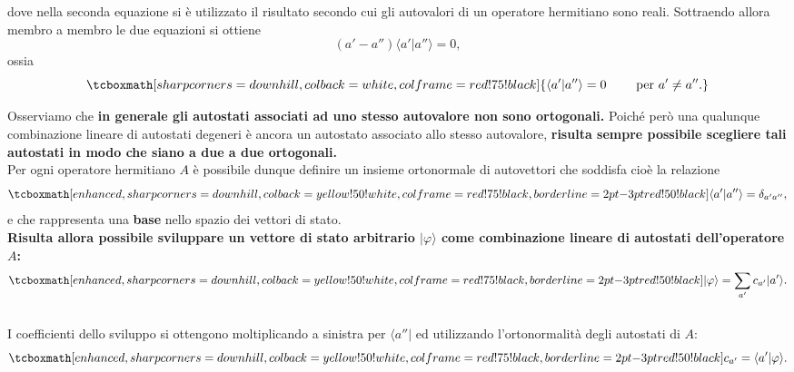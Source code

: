 \documentclass[a4paper,12pt,oneside]{book}
\begin{document}
\begin{enumerate}
\begin{equation}
	\end{equation}
dove nella seconda equazione si è utilizzato il risultato secondo cui gli autovalori di un operatore hermitiano sono reali. Sottraendo allora membro a membro le due equazioni si ottiene
	\begin{equation}
		(a'-a'') \langle a' \vert a'' \rangle =0,
	\end{equation}
ossia
	\begin{equation}
		\tcboxmath[sharp corners=downhill ,colback=white,colframe=red!75!black]{
		\langle a' \vert a'' \rangle =0 \qquad \textrm{ per } a' \neq a'' .
		}
	\end{equation}
\end{enumerate}

Osserviamo che \textbf{in generale gli autostati associati ad uno stesso autovalore non sono ortogonali.} Poiché però una qualunque combinazione lineare di autostati degeneri è ancora un autostato associato allo stesso autovalore, \textbf{risulta sempre possibile scegliere tali autostati in modo che siano a due a due ortogonali.}\\

Per ogni operatore hermitiano $A$ è possibile dunque definire un insieme ortonormale di autovettori che soddisfa cioè la relazione 
	\begin{equation}
		\tcboxmath[enhanced,sharp corners=downhill ,colback=yellow!50!white,colframe=red!75!black, borderline={2pt}{-3pt}{red!50!black}]{
			\langle a' \vert a'' \rangle = \delta _{a' a''},
			}
	\end{equation}
e che rappresenta una \textbf{base} nello spazio dei vettori di stato.\\

\textbf{Risulta allora possibile sviluppare un vettore di stato arbitrario $\vert \varphi \rangle $ come combinazione lineare di autostati dell'operatore $A$:}
	\begin{equation}
		\tcboxmath[enhanced,sharp corners=downhill ,colback=yellow!50!white,colframe=red!75!black, borderline={2pt}{-3pt}{red!50!black}]{
			\vert \varphi \rangle = \sum _{a'} c_{a'} \vert a' \rangle .
			}
	\end{equation}
\\

I coefficienti dello sviluppo si ottengono moltiplicando  a sinistra per $\langle a'' \vert $ ed utilizzando l'ortonormalità degli autostati di $A$:
	\begin{equation}
		\tcboxmath[enhanced,sharp corners=downhill ,colback=yellow!50!white,colframe=red!75!black, borderline={2pt}{-3pt}{red!50!black}]{
			c_{a'} = \langle a' \vert \varphi \rangle .
			}
	\end{equation}
	\\
	
\end{document}
